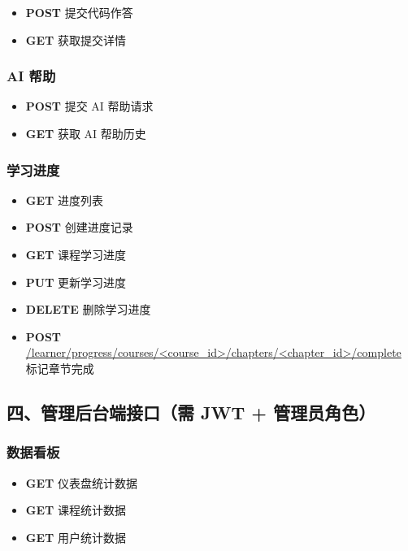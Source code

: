 \begin{appendices}
\begin{itemize}
  \item \textbf{POST}  \hfill 提交代码作答
  \item \textbf{GET}  \hfill 获取提交详情
\end{itemize}

\subsubsection*{AI 帮助}

\begin{itemize}
  \item \textbf{POST}  \hfill 提交 AI 帮助请求
  \item \textbf{GET}  \hfill 获取 AI 帮助历史
\end{itemize}

\subsubsection*{学习进度}

\begin{itemize}
  \item \textbf{GET}  \hfill 进度列表
  \item \textbf{POST}  \hfill 创建进度记录
  \item \textbf{GET}  \hfill 课程学习进度
  \item \textbf{PUT}  \hfill 更新学习进度
  \item \textbf{DELETE}  \hfill 删除学习进度
  \item \textbf{POST} \url{/learner/progress/courses/<course_id>/chapters/<chapter_id>/complete} \hfill 标记章节完成
\end{itemize}

\subsection*{四、管理后台端接口（需 JWT + 管理员角色）}

\subsubsection*{数据看板}

\begin{itemize}
  \item \textbf{GET}  \hfill 仪表盘统计数据
  \item \textbf{GET}  \hfill 课程统计数据
  \item \textbf{GET}  \hfill 用户统计数据
\end{itemize}


\end{appendices}
